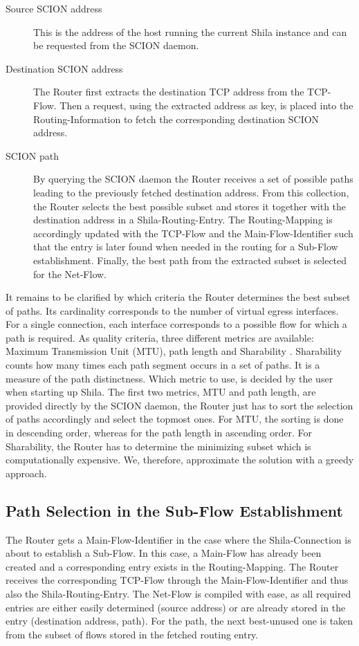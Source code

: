 \begin{description}
	\item[Source SCION address] This is the address of the host running the current Shila instance and can be requested from the SCION daemon.
	\item[Destination SCION address] The Router first extracts the destination TCP address from the TCP-Flow. Then a request, using the extracted address as key, is placed into the Routing-Information to fetch the corresponding destination SCION address.
	\item[SCION path] By querying the SCION daemon the Router receives a set of possible paths leading to the previously fetched destination address. From this collection, the Router selects the best possible subset and stores it together with the destination address in a Shila-Routing-Entry. The Routing-Mapping is accordingly updated with the TCP-Flow and the Main-Flow-Identifier such that the entry is later found when needed in the routing for a Sub-Flow establishment. Finally, the best path from the extracted subset is selected for the Net-Flow.
\end{description}

It remains to be clarified by which criteria the Router determines the best subset of paths. Its cardinality corresponds to the number of virtual egress interfaces. For a single connection, each interface corresponds to a possible flow for which a path is required. As quality criteria, three different metrics are available: Maximum Transmission Unit (MTU), path length and Sharability \cite{Sharability}. Sharability counts how many times each path segment occurs in a set of paths. It is a measure of the path distinctness. Which metric to use, is decided by the user when starting up Shila. The first two metrics, MTU and path length, are provided directly by the SCION daemon, the Router just has to sort the selection of paths accordingly and select the topmost ones. For MTU, the sorting is done in descending order, whereas for the path length in ascending order. For Sharability, the Router has to determine the minimizing subset which is computationally expensive. We, therefore, approximate the solution with a greedy approach.

\subsection*{Path Selection in the Sub-Flow Establishment}

The Router gets a Main-Flow-Identifier in the case where the Shila-Connection is about to establish a Sub-Flow. In this case, a Main-Flow has already been created and a corresponding entry exists in the Routing-Mapping. The Router receives the corresponding TCP-Flow through the Main-Flow-Identifier and thus also the Shila-Routing-Entry. The Net-Flow is compiled with ease, as all required entries are either easily determined (source address) or are already stored in the entry (destination address, path). For the path, the next best-unused one is taken from the subset of flows stored in the fetched routing entry.

